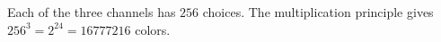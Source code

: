 Each of the three channels has $256$ choices. The multiplication principle gives $256^3=2^{24}=\boxed{16777216}$ colors.
